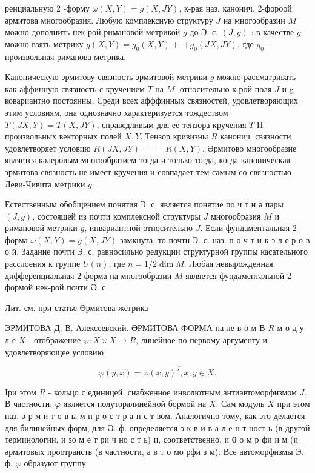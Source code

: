 \documentclass[10pt]{article}
\begin{document}
ренциальную 2 -форму $\omega(X, Y)=g(X, J Y)$, к-рая наз. канонич. 2-фороой әрмитова многообразия. Любую комплексную структуру $J$ на многообразии $M$ можно дополнить нек-рой римановой метрикой $g$ до Э. с. $(J, g)$ : в качестве $g$ можно взять метрику $g(X, Y)=g_{0}(X, Y)+$ $+g_{0}(J X, J Y)$, где $g_{0}-$ произвольная риманова метрика.



Каноническую эрмитову связность эрмитовой метрики $g$ можно рассматривать как аффинную связность с кручением $T$ на $M$, относительно к-рой поля $J$ и g ковариантно постоянны. Среди всех афффинных связностей, удовлетворяющих этим условиям, она однозначно характеризуется тождеством $T(J X, Y)=T(X, J Y)$, справедливым для ее тензора кручения $T$ П произвольных векторных полей $X, Y$. Тензор кривизны $R$ канонич. связности удовлетворяет условию $R(J X, J Y)=$ $=R(X, Y)$. Әрмитово многообразие является кәлеровым многообразием тогда и только тогда, когда каноническая эрмитова связность не имеет кручения и совпадает тем самым со связностью Леви-Чивита метрики $g$.



Естественным обобщением понятия Э. с. является понятие по ч т и ә пары $(J, g)$, состоящей из почти комплексной структуры $J$ многообразия $M$ и римановой метрики $g$, инвариантной относительно $J$. Если фундаментальная 2-форма $\omega(X, Y)=g(X, J Y)$ замкнута, то почти Э. с. наз. п о ч т и к э л е р о в о й. Задание почти Э. с. равносильно редукции структурной группы касательного расслоения к группе $U(n)$, где $n=1 / 2 \operatorname{dim} M$. Любая невырожденная дифференциальная 2-форма на многообразии $M$ является фундаментальной 2-формой нек-рой почти Ә. с.



Лит. см. при статье Өрмитова жетрика



ЭРМИТОВА Д. В. Алексеевский. ӘРМИТОВА ФОРМА на ле в о м В $R$-м о д у л е $X$ - отображение $\varphi: X \times X \rightarrow R$, линейное по первому аргументу и удовлетворяющее условию



\[

\varphi(y, x)=\varphi(x, y)^{J}, x, y \in X .

\]



Iри этом $R$ - кольцо с единицей, снабженное инволютным антиавтоморфизмом $J$. В частности, $\varphi$ является полуторалинейной бормой на $X$. Сам модуль $X$ при этом наз. ә р м и т о в ы м п р о с т р а н с т вом. Аналогично тому, как это делается для билинейных форм, для Ә. ф. определяется э к в и в а л е н т ност ь (в другой терминологии, и зо м е т ри ч но с т ь) и, соответственно, и $\mathbf{0}$ о м р фи и м (и әрмитовых проотранств (в частности, а в т о мо рфи з м). Все автоморфизмы Э. ф. $\varphi$ образуют группу
\end{document}
